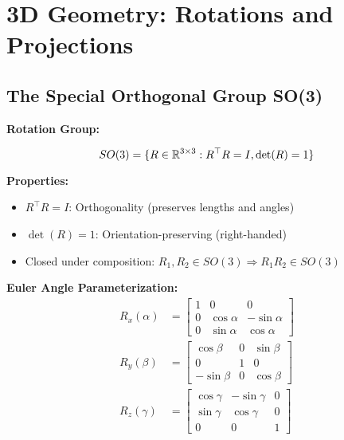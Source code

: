 \section{3D Geometry: Rotations and Projections}

\subsection{The Special Orthogonal Group SO(3)}

\begin{seanbox}{3.8}
	\textbf{Rotation Group:}
	
	\begin{equation}
		SO(3) = \{ R \in \mathbb{R}^{3 \times 3} : R^\top R = I, \det(R) = 1 \}
	\end{equation}
	
	\textbf{Properties:}
	\begin{itemize}
		\item $R^\top R = I$: Orthogonality (preserves lengths and angles)
		\item $\det(R) = 1$: Orientation-preserving (right-handed)
		\item Closed under composition: $R_1, R_2 \in SO(3) \Rightarrow R_1 R_2 \in SO(3)$
	\end{itemize}
	
	\textbf{Euler Angle Parameterization:}
	\begin{align}
		R_x(\alpha) &= \begin{bmatrix} 1 & 0 & 0 \\ 0 & \cos\alpha & -\sin\alpha \\ 0 & \sin\alpha & \cos\alpha \end{bmatrix} \\
		R_y(\beta) &= \begin{bmatrix} \cos\beta & 0 & \sin\beta \\ 0 & 1 & 0 \\ -\sin\beta & 0 & \cos\beta \end{bmatrix} \\
		R_z(\gamma) &= \begin{bmatrix} \cos\gamma & -\sin\gamma & 0 \\ \sin\gamma & \cos\gamma & 0 \\ 0 & 0 & 1 \end{bmatrix}
	\end{align}
\end{seanbox}

